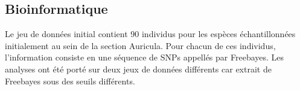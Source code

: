 \documentclass[12pt,a4paper,notitlepage]{article}
\begin{document}

\subsection{Bioinformatique}

Le jeu de données initial contient 90 individus pour les espèces échantillonnées initialement au sein de la section Auricula. Pour chacun de ces individus, l'information consiste en une séquence de SNPs appellés par Freebayes. Les analyses ont été porté sur deux jeux de données différents car extrait de Freebayes sous des seuils différents.
\end{document}
